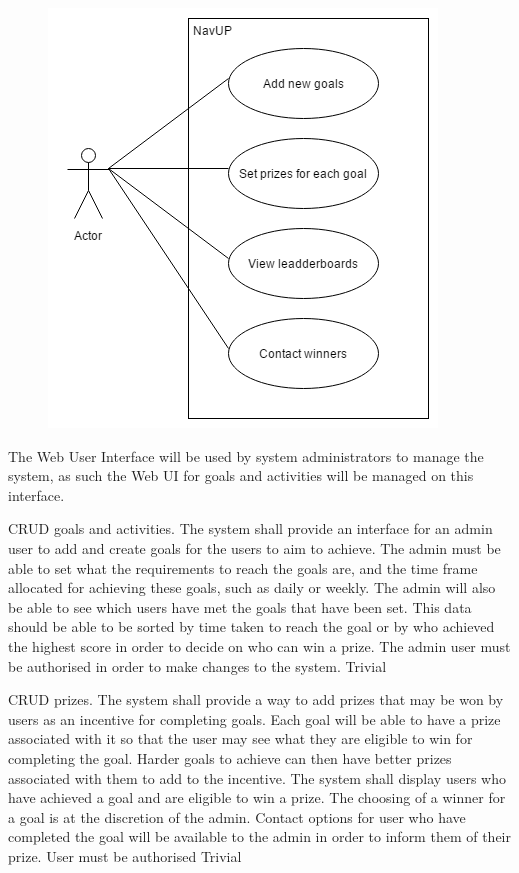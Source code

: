\begin{figure} 
  \includegraphics[width=\textwidth]{diagrams/Specific_Requirements/Goals_WebUI_Actor_Syetem_Interaction.png}
\end{figure}

The Web User Interface will be used by system administrators to manage the system, as such the Web UI for goals and activities will be managed on this interface.
\\
\bigskip

\FuncReq
{CRUD goals and activities.}
{The system shall provide an interface for an admin user to add and create goals for the users to aim to achieve. The admin must be able to set what the requirements to reach the goals are, and the time frame allocated for achieving these goals, such as daily or weekly. The admin will also be able to see which users have met the goals that have been set. This data should be able  to be sorted by time taken to reach the goal or by who achieved the highest score in order to decide on who can win a prize.}
{The admin user must be authorised in order to make changes to the system.}
{Trivial}

\FuncReq
{CRUD prizes.}
{The system shall provide a way to add prizes that may be won by users as an incentive for completing goals. Each goal will be able to have a prize associated with it so that the user may see what they are eligible to win for completing the goal. Harder goals to achieve can then have better prizes associated with them to add to the incentive. The system shall display users who have achieved a goal and are eligible to win a prize. The choosing of a winner for a goal is at the discretion of the admin. Contact options for user who have completed the goal will be available to the admin in order to inform them of their prize.}
{User must be authorised}
{Trivial}
